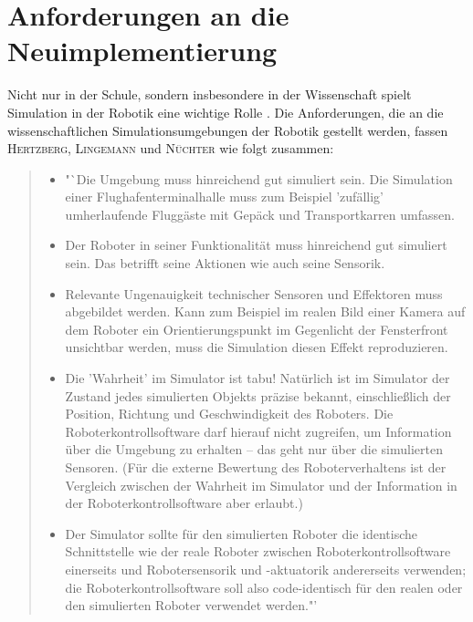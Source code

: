 \documentclass[paper=a4, DIV=calc, BCOR=15mm, twoside=on, onecolumn=on, open = right, titlepage =on, parskip =half, headsepline = on, footsepline = on, chapterprefix = off, appendixprefix = off, fontsize = 12pt, numbers = noenddot, abstract = on]{scrbook}
\begin{document}
\chapter{Anforderungen an die Neu\-im\-ple\-men\-tie\-rung}
\label{chap:anforderungen}
\onehalfspacing
Nicht nur in der Schule, sondern insbesondere in der Wissenschaft spielt Simulation in der Robotik eine wichtige Rolle \cite[S.13]{hertzberg:12}. Die Anforderungen, die an die wissenschaftlichen Simulationsumgebungen der Robotik gestellt werden, fassen \textsc{Hertzberg, Lingemann} und \textsc{Nüchter} wie folgt zusammen:
\begin{quote}
\begin{itemize}
\item "`Die Umgebung muss hinreichend gut simuliert sein. Die Simulation einer Flughafenterminalhalle muss zum Beispiel 'zufällig' umherlaufende Fluggäste mit Gepäck und Transportkarren umfassen.

\item Der Roboter in seiner Funktionalität muss hinreichend gut simuliert sein. Das betrifft seine Aktionen wie auch seine Sensorik.

\item Relevante Ungenauigkeit technischer Sensoren und Effektoren muss abgebildet werden. Kann zum Beispiel im realen Bild einer Kamera auf dem Roboter ein Orientierungspunkt im Gegenlicht der Fensterfront unsichtbar werden, muss die Simulation diesen Effekt reproduzieren.

\item Die 'Wahrheit' im Simulator ist tabu! Natürlich ist im Simulator der Zustand jedes simulierten Objekts präzise bekannt, einschließlich der Position, Richtung und Geschwindigkeit des Roboters. Die Roboterkontrollsoftware darf hierauf nicht zugreifen, um Information über die Umgebung zu erhalten -- das geht nur über die simulierten Sensoren. (Für die externe Bewertung des Roboterverhaltens ist der Vergleich zwischen der Wahrheit im Simulator und der Information in der Roboterkontrollsoftware aber erlaubt.)

\item Der Simulator sollte für den simulierten Roboter die identische Schnittstelle wie der reale Roboter zwischen Roboterkontrollsoftware einerseits und Robotersensorik und -aktuatorik andererseits verwenden; die Roboterkontrollsoftware soll also code-identisch für den realen oder den simulierten Roboter verwendet werden."' \cite[S.14]{hertzberg:12} 
\end{itemize}
\end{quote}
\end{document}
